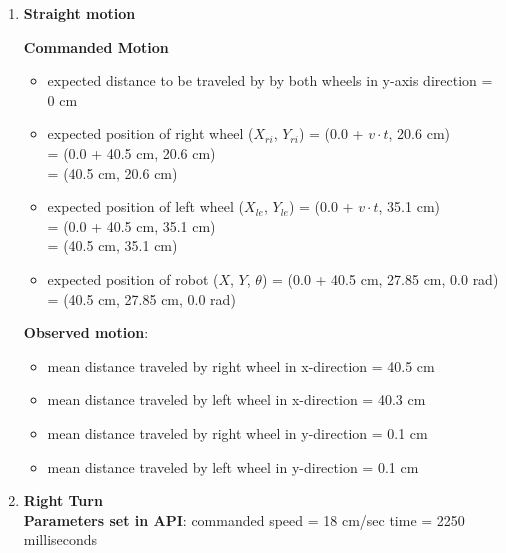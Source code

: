 \begin{enumerate}
\item \textbf{Straight motion}

	\textbf{Commanded Motion}

	\begin{itemize}

		\item expected distance to be traveled by by both wheels in y-axis direction = $0$ cm
	
		\item expected position of right wheel ($X_{ri}$, $Y_{ri}$) = (0.0 + $v\cdot t$, 20.6 cm) \\
			   = (0.0 + 40.5 cm, 20.6 cm)\\
			 = (40.5 cm, 20.6 cm)
	
		\item expected position of left wheel ($X_{le}$, $Y_{le}$) = (0.0 + $v\cdot t$, 35.1 cm) \\
		= (0.0 + 40.5 cm, 35.1 cm)\\
		= (40.5 cm, 35.1 cm)
	
		\item expected position of robot ($X$, $Y$, $\theta$) = (0.0 + 40.5 cm, 27.85 cm, 0.0 rad) = (40.5 cm, 27.85 cm, 0.0 rad)
	
	
	
	
	\end{itemize}
	
	\textbf{Observed motion}:
	\begin{itemize}
		\item mean distance traveled by right wheel in x-direction = 40.5 cm
		
		\item mean distance traveled by left wheel in x-direction = 40.3 cm 
		
		\item mean distance traveled by right wheel in y-direction = 0.1 cm 
		
		\item mean distance traveled by left wheel in y-direction = 0.1 cm 
		
		
	\end{itemize}



	
\item \textbf{Right Turn} \\
	\textbf{Parameters set in API}: \newline
	commanded speed = 18 cm/sec \newline
	time = 2250 milliseconds \newline
	

\end{enumerate}

